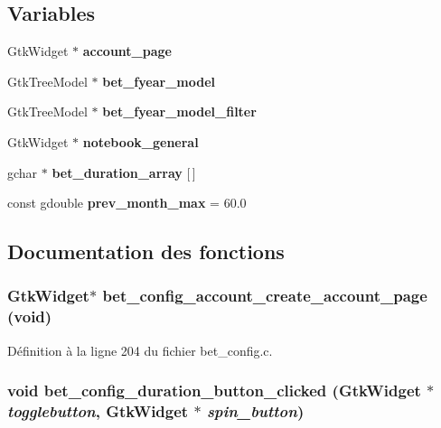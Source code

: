 \subsection*{Variables}
\begin{DoxyCompactItemize}
\item 
GtkWidget $\ast$ {\bf account\_\-page}
\item 
GtkTreeModel $\ast$ {\bf bet\_\-fyear\_\-model}
\item 
GtkTreeModel $\ast$ {\bf bet\_\-fyear\_\-model\_\-filter}
\item 
GtkWidget $\ast$ {\bf notebook\_\-general}
\item 
gchar $\ast$ {\bf bet\_\-duration\_\-array} [$\,$]
\item 
const gdouble {\bf prev\_\-month\_\-max} = 60.0
\end{DoxyCompactItemize}


\subsection{Documentation des fonctions}
\subsubsection[{bet\_\-config\_\-account\_\-create\_\-account\_\-page}]{\setlength{\rightskip}{0pt plus 5cm}GtkWidget$\ast$ bet\_\-config\_\-account\_\-create\_\-account\_\-page (void)}\label{bet__config_8c_abeafee7e6cbd8bdf2c9f6f93ef24a964}


Définition à la ligne 204 du fichier bet\_\-config.c.

\subsubsection[{bet\_\-config\_\-duration\_\-button\_\-clicked}]{\setlength{\rightskip}{0pt plus 5cm}void bet\_\-config\_\-duration\_\-button\_\-clicked (GtkWidget $\ast$ {\em togglebutton}, \/  GtkWidget $\ast$ {\em spin\_\-button})}\label{bet__config_8c_ac071c5c9f911ec54c1d9fd38d697a238}


